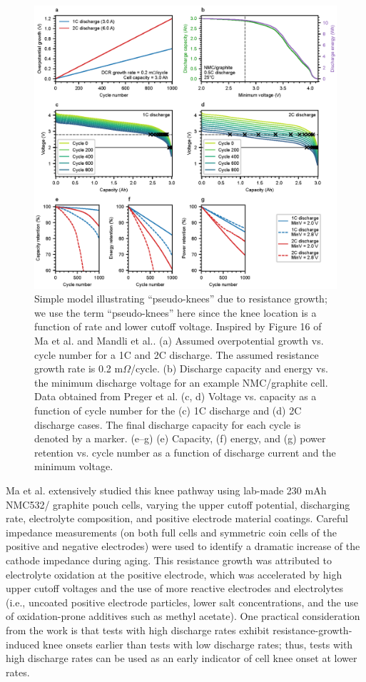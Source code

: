 \documentclass[journal=jpclcd,manuscript=article]{achemso}
\begin{document}
\begin{figure}
\centering
\includegraphics[scale = 1]{figures/dcr_growth_knee_2.eps}
\caption{Simple model illustrating ``pseudo-knees'' due to resistance growth; we use the term ``pseudo-knees'' here since the knee location is a function of rate and lower cutoff voltage. Inspired by Figure 16 of Ma et al.\cite{ma_editors_2019} and Mandli et al.\cite{mandli_analysis_2019}. (a) Assumed overpotential growth vs. cycle number for a 1C and 2C discharge. The assumed resistance growth rate is 0.2 m$\Omega$/cycle. (b) Discharge capacity and energy vs. the minimum discharge voltage for an example NMC/graphite cell. Data obtained from Preger et al.\cite{preger_degradation_2020} (c, d) Voltage vs. capacity as a function of cycle number for the (c) 1C discharge and (d) 2C discharge cases. The final discharge capacity for each cycle is denoted by a marker. (e--g) (e) Capacity, (f) energy, and (g) power retention vs. cycle number as a function of discharge current and the minimum voltage.
}
\label{fig:dcr_knee}
\end{figure}

Ma et al.\cite{ma_editors_2019} extensively studied this knee pathway using lab-made 230 mAh NMC532/ graphite pouch cells, varying the upper cutoff potential, discharging rate, electrolyte composition, and positive electrode material coatings. Careful impedance measurements (on both full cells and symmetric coin cells of the positive and negative electrodes) were used to identify a dramatic increase of the cathode impedance during aging. This resistance growth was attributed to electrolyte oxidation at the positive electrode, which was accelerated by high upper cutoff voltages and the use of more reactive electrodes and electrolytes (i.e., uncoated positive electrode particles, lower salt concentrations, and the use of oxidation-prone additives such as methyl acetate). One practical consideration from the work is that tests with high discharge rates exhibit resistance-growth-induced knee onsets earlier than tests with low discharge rates; thus, tests with high discharge rates can be used as an early indicator of cell knee onset at lower rates.
\end{document}
